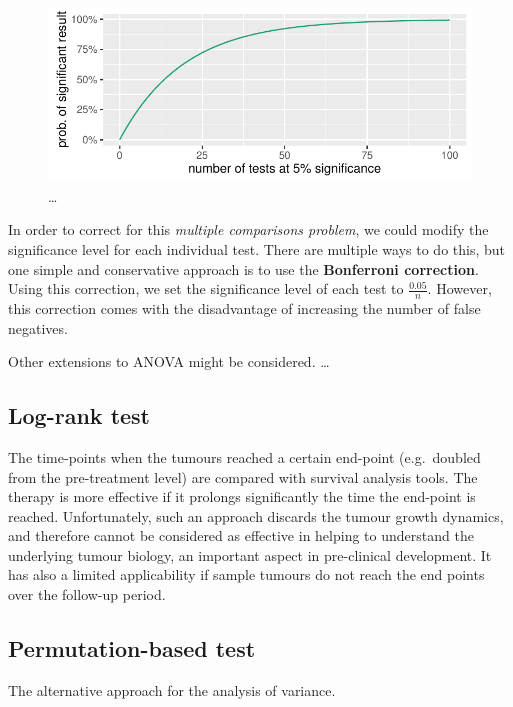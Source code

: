 \begin{figure}
  \includegraphics{xenograph/figures/multiple_significance.pdf}
  \caption{\ldots}
  \label{fig:multiple-significance}
\end{figure}

In order to correct for this \emph{multiple comparisons problem}, we could modify the significance level for each individual test.
There are multiple ways to do this, but one simple and conservative approach is to use the \textbf{Bonferroni correction}.
Using this correction, we set the significance level of each test to $\frac{0.05}{n}$.
However, this correction comes with the disadvantage of increasing the number of false negatives.

Other extensions to ANOVA might be considered.
\ldots

\subsection{Log-rank test}
The time-points when the tumours reached a certain end-point (e.g.\
doubled from the pre-treatment level) are compared with survival analysis tools.
The therapy is more effective if it prolongs significantly the time the end-point is reached.
Unfortunately, such an approach discards the tumour growth dynamics, and therefore cannot be considered as effective in helping to understand the underlying tumour biology, an important aspect in pre-clinical development.
It has also a limited applicability if sample tumours do not reach the end points over the follow-up period.

\subsection{Permutation-based test}
The alternative approach for the analysis of variance.

